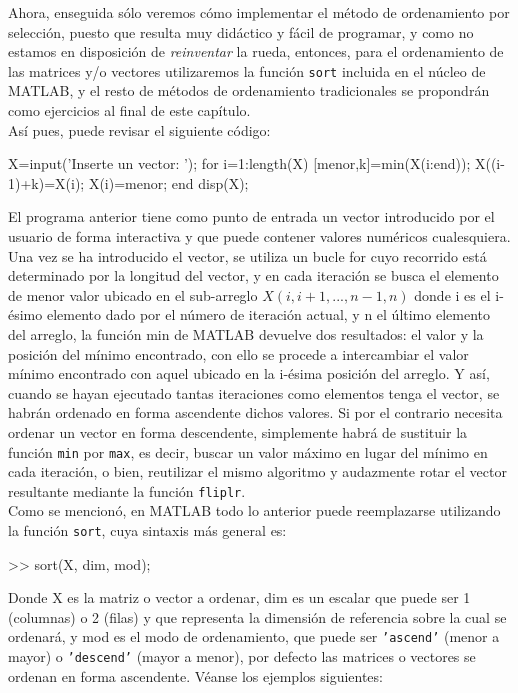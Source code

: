 Ahora, enseguida sólo veremos cómo implementar el método de ordenamiento
por selección, puesto que resulta muy didáctico y fácil de programar, y
como no estamos en disposición de \emph{reinventar} la rueda, entonces,
para el ordenamiento de las matrices y/o vectores utilizaremos la
función \texttt{sort} incluida en el núcleo de MATLAB, y el resto de
métodos de ordenamiento tradicionales se propondrán como ejercicios al
final de este capítulo. \\

Así pues, puede revisar el siguiente código:

\begin{matlab}
X=input('Inserte un vector: ');
for i=1:length(X)
    [menor,k]=min(X(i:end));
    X((i-1)+k)=X(i);
    X(i)=menor;
end
disp(X); %
\end{matlab}

El programa anterior tiene como punto de entrada un vector introducido
por el usuario de forma interactiva y que puede contener valores
numéricos cualesquiera. Una vez se ha introducido el vector, se utiliza
un bucle for cuyo recorrido está determinado por la longitud del vector,
y en cada iteración se busca el elemento de menor valor ubicado en el
sub-arreglo $X(i,i+1,...,n-1,n)$ donde i es el i-ésimo elemento
dado por el número de iteración actual, y n el último elemento del
arreglo, la función min de MATLAB devuelve dos resultados: el valor y la
posición del mínimo encontrado, con ello se procede a intercambiar el
valor mínimo encontrado con aquel ubicado en la i-ésima posición del
arreglo. Y así, cuando se hayan ejecutado tantas iteraciones como
elementos tenga el vector, se habrán ordenado en forma ascendente dichos
valores. Si por el contrario necesita ordenar un vector en forma
descendente, simplemente habrá de sustituir la función \texttt{min} por
\texttt{max}, es decir, buscar un valor máximo en lugar del mínimo en
cada iteración, o bien, reutilizar el mismo algoritmo y audazmente rotar
el vector resultante mediante la función \texttt{fliplr}. \\

Como se mencionó, en MATLAB todo lo anterior puede reemplazarse
utilizando la función \texttt{sort}, cuya sintaxis más general es:

\begin{matlab}
>> sort(X, dim, mod);
\end{matlab}

Donde X es la matriz o vector a ordenar, dim es un escalar que puede ser
1 (columnas) o 2 (filas) y que representa la dimensión de referencia
sobre la cual se ordenará, y mod es el modo de ordenamiento, que puede
ser \texttt{'ascend'} (menor a mayor) o \texttt{'descend'} (mayor a
menor), por defecto las matrices o vectores se ordenan en forma
ascendente. Véanse los ejemplos siguientes:

